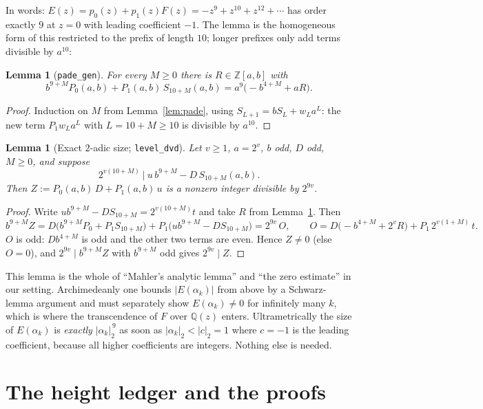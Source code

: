 \documentclass[11pt]{article}
\newtheorem{lemma}[theorem]{Lemma}
\theoremstyle{definition}
\newcommand{\Z}{\mathbb{Z}}
\newcommand{\Q}{\mathbb{Q}}
\newcommand{\code}[1]{\texttt{#1}}
\begin{document}
In words: $E(z) = p_0(z) + p_1(z) F(z) = -z^9 + z^{10} + z^{12} +
\cdots$ has order exactly $9$ at $z = 0$ with leading coefficient
$-1$. The lemma is the homogeneous form of this restricted to the
prefix of length $10$; longer prefixes only add terms divisible by
$a^{10}$:

\begin{lemma}[\code{pade\_gen}]\label{lem:padegen}
For every $M \ge 0$ there is $R \in \Z[a,b]$ with
\[
b^{9+M} P_0(a,b) + P_1(a,b)\, S_{10+M}(a,b) = a^9\big(-b^{4+M} + aR\big).
\]
\end{lemma}

\begin{proof}
Induction on $M$ from Lemma~\ref{lem:pade}, using $S_{L+1} = b S_L +
w_L a^L$: the new term $P_1 w_{L} a^{L}$ with $L = 10 + M \ge 10$ is
divisible by $a^{10}$.
\end{proof}

\begin{lemma}[Exact $2$-adic size; \code{level\_dvd}]\label{lem:size}
Let $v \ge 1$, $a = 2^v$, $b$ odd, $D$ odd, $M \ge 0$, and suppose
\[
2^{v(10+M)} \ \Big|\ u\, b^{9+M} - D\, S_{10+M}(a,b).
\]
Then $Z := P_0(a,b)\, D + P_1(a,b)\, u$ is a nonzero integer divisible
by $2^{9v}$.
\end{lemma}

\begin{proof}
Write $u b^{9+M} - D S_{10+M} = 2^{v(10+M)} t$ and take $R$ from
Lemma~\ref{lem:padegen}. Then
\[
b^{9+M} Z = D\big(b^{9+M}P_0 + P_1 S_{10+M}\big) + P_1\big(u b^{9+M} -
D S_{10+M}\big) = 2^{9v}\, O, \qquad
O = D\big(-b^{4+M} + 2^v R\big) + P_1\, 2^{v(1+M)}\, t .
\]
$O$ is odd: $D b^{4+M}$ is odd and the other two terms are even. Hence
$Z \ne 0$ (else $O = 0$), and $2^{9v} \mid b^{9+M} Z$ with $b^{9+M}$
odd gives $2^{9v} \mid Z$.
\end{proof}

This lemma is the whole of ``Mahler's analytic lemma'' and ``the zero
estimate'' in our setting. Archimedeanly one bounds $|E(\alpha_k)|$
from above by a Schwarz-lemma argument and must separately show
$E(\alpha_k) \ne 0$ for infinitely many $k$, which is where the
transcendence of $F$ over $\Q(z)$ enters. Ultrametrically the size
of $E(\alpha_k)$ is \emph{exactly} $|\alpha_k|_2^{\,9}$ as soon as
$|\alpha_k|_2 < |c|_2 = 1$ where $c = -1$ is the leading coefficient,
because all higher coefficients are integers. Nothing else is needed.

\section{The height ledger and the proofs}\label{sec:ledger}
\end{document}

